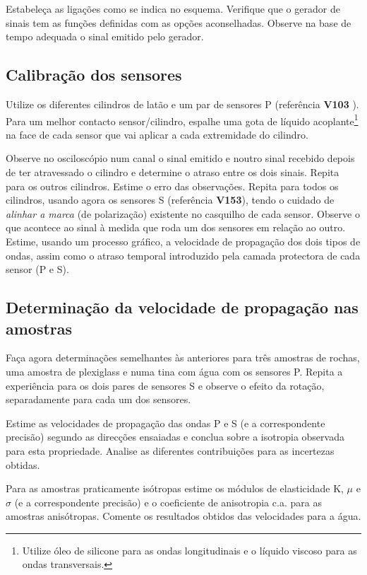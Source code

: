 \documentclass[a4paper,12pt]{article}
\begin{document}
 Estabeleça as ligações como se indica no esquema. Verifique que o gerador de sinais tem as funções definidas com as opções aconselhadas.
Observe na base de tempo adequada o sinal emitido pelo gerador.

\subsection{\sf Calibração dos sensores}
Utilize os diferentes cilindros de latão e um par de sensores P (referência \textbf{V103} ). Para um melhor contacto sensor/cilindro, espalhe uma gota de líquido acoplante\footnote{Utilize óleo de silicone para as ondas longitudinais e o líquido viscoso para as ondas transversais.} na face de cada sensor que vai aplicar a cada extremidade do cilindro.

Observe no osciloscópio num canal o sinal emitido e noutro  sinal recebido depois de ter atravessado o cilindro e determine o atraso entre os dois sinais. Repita para os outros cilindros. Estime o erro das observações.
Repita para todos os cilindros, usando agora os sensores S (referência  \textbf{V153}), tendo o cuidado de  \emph{alinhar a marca}  (de polarização) existente no casquilho de cada sensor. 
Observe o que acontece ao sinal à medida que roda um dos sensores em relação ao outro.
Estime, usando um processo gráfico, a velocidade de propagação dos dois tipos de ondas, assim como o atraso temporal introduzido pela camada protectora de cada sensor (P e S).

\subsection{\sf Determinação da velocidade de propagação nas amostras}
Faça agora determinações semelhantes às anteriores para três amostras de rochas, uma amostra de plexiglass e numa tina com água  com os sensores P. Repita a experiência para os dois pares de sensores S e observe o efeito da rotação, separadamente para cada um dos sensores.

Estime as velocidades de propagação das ondas P e S (e a correspondente precisão) segundo as direcções ensaiadas e conclua sobre a isotropia observada para esta propriedade. Analise as diferentes contribuições para as incertezas obtidas.

Para as amostras praticamente isótropas estime os módulos de elasticidade K, $\mu$ e $\sigma$ (e a correspondente precisão) e o coeficiente de anisotropia c.a. para as amostras anisótropas.
Comente os resultados obtidos das velocidades para a água.
\end{document}
